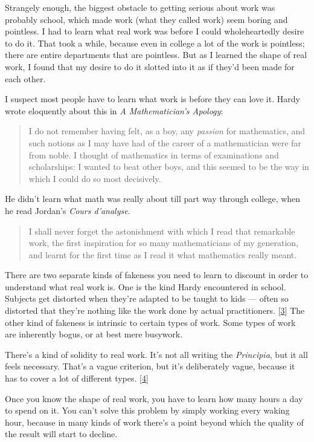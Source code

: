 Strangely enough, the biggest obstacle to getting serious about work was
probably school, which made work (what they called work) seem boring and
pointless. I had to learn what real work was before I could
wholeheartedly desire to do it. That took a while, because even in
college a lot of the work is pointless; there are entire departments
that are pointless. But as I learned the shape of real work, I found
that my desire to do it slotted into it as if they'd been made for each
other.

I suspect most people have to learn what work is before they can love
it. Hardy wrote eloquently about this in \emph{A Mathematician's
Apology}:

\begin{quote}
I do not remember having felt, as a boy, any \emph{passion} for
mathematics, and such notions as I may have had of the career of a
mathematician were far from noble. I thought of mathematics in terms of
examinations and scholarships: I wanted to beat other boys, and this
seemed to be the way in which I could do so most decisively.
\end{quote}

He didn't learn what math was really about till part way through
college, when he read Jordan's \emph{Cours d'analyse}.

\begin{quote}
I shall never forget the astonishment with which I read that remarkable
work, the first inspiration for so many mathematicians of my generation,
and learnt for the first time as I read it what mathematics really
meant.
\end{quote}

There are two separate kinds of fakeness you need to learn to discount
in order to understand what real work is. One is the kind Hardy
encountered in school. Subjects get distorted when they're adapted to be
taught to kids --- often so distorted that they're nothing like the work
done by actual practitioners. {[}\hyperref[f3n]{3}{]} The other kind of
fakeness is intrinsic to certain types of work. Some types of work are
inherently bogus, or at best mere busywork.

There's a kind of solidity to real work. It's not all writing the
\emph{Principia}, but it all feels necessary. That's a vague criterion,
but it's deliberately vague, because it has to cover a lot of different
types. {[}\hyperref[f4n]{4}{]}

Once you know the shape of real work, you have to learn how many hours a
day to spend on it. You can't solve this problem by simply working every
waking hour, because in many kinds of work there's a point beyond which
the quality of the result will start to decline.

